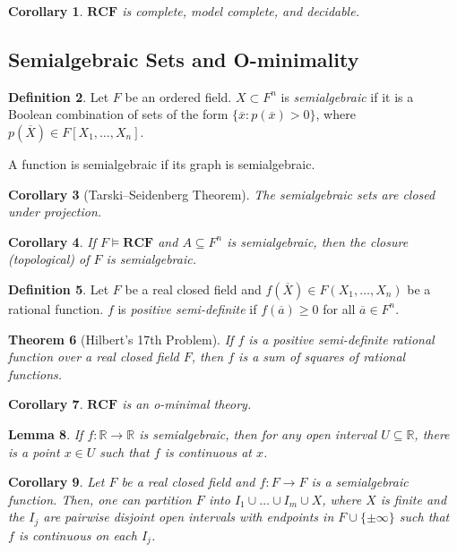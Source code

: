 \documentclass{amsart}
\newtheorem{theorem}{Theorem}[subsection]
\newtheorem{lemma}[theorem]{Lemma}
\newtheorem{corollary}[theorem]{Corollary}
\theoremstyle{definition}
\newtheorem{definition}[theorem]{Definition}
\numberwithin{equation}{section}
\begin{document}
\begin{corollary}
	$\mathbf{RCF}$ is complete, model complete, and decidable.
\end{corollary}

\subsection{Semialgebraic Sets and O-minimality}
\begin{definition}
	Let $F$ be an ordered field.
	$X \subset F^n$ is \emph{semialgebraic} if it is a Boolean combination of sets of the form $\{\overline{x}:p(\overline{x})>0\}$,
	where $p(\overline{X}) \in F[X_1,\dots,X_n]$.

	A function is semialgebraic if its graph is semialgebraic.
\end{definition}

\begin{corollary}[Tarski--Seidenberg Theorem]
	The semialgebraic sets are closed under projection.
\end{corollary}

\begin{corollary}
	If $F \models \mathbf{RCF}$ and $A \subseteq F^n$ is semialgebraic,
	then the closure (topological) of $F$ is semialgebraic.
\end{corollary}

\begin{definition}
	Let $F$ be a real closed field and
	$f(\overline{X}) \in F(X_1,\dots,X_n)$ be a rational function.
	$f$ is \emph{positive semi-definite} if $f(\overline{a}) \ge 0$ for all $\overline{a} \in F^n$.
\end{definition}

\begin{theorem}[Hilbert's 17th Problem]
	If $f$ is a positive semi-definite rational function over a real closed field $F$,
	then $f$ is a sum of squares of rational functions.
\end{theorem}

\begin{corollary}
	$\mathbf{RCF}$ is an o-minimal theory.
\end{corollary}

\begin{lemma}
	If $f:\mathbb{R} \to \mathbb{R}$ is semialgebraic,
	then for any open interval $U \subseteq \mathbb{R}$,
	there is a point $x\in U$ such that $f$ is continuous at $x$.
\end{lemma}

\begin{corollary}
	Let $F$ be a real closed field and $f: F \to F$ is a semialgebraic function.
	Then, one can partition $F$ into $I_1\cup \dots \cup I_m\cup X$,
	where $X$ is finite and the $I_j$ are pairwise disjoint open intervals with endpoints in $F\cup \{\pm\infty\}$
	such that $f$ is continuous on each $I_j$.
\end{corollary}
\end{document}
